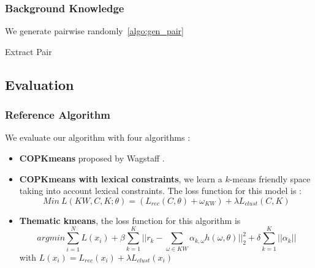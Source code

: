 \subsubsection{Background Knowledge}
We generate pairwise randomly~\ref{algo:gen_pair}
\begin{algorithm}[!h]
  \caption{\label{algo:gen_pair}Extract Pair}
\end{algorithm}
\subsection{Evaluation}
\subsubsection{Reference Algorithm}
We evaluate our algorithm with four algorithms :
\begin{itemize}
\item \textbf{COPKmeans} proposed by Wagstaff \cite{Wagstaff:2001:CKC:645530.655669}.
\item \textbf{COPKmeans with lexical constraints}, we learn a $k$-means
  friendly space taking into account lexical constraints. The loss
  function for this model is :
  \begin{equation}
  Min~L(KW, C, K; \theta) = (L_{rec}(C, \theta) + \omega_{KW} )+
  \lambda L_{clust}(C,K)
  \end{equation}
\item \textbf{Thematic kmeans}, the loss function for this algorithm is
  \begin{equation}
    argmin \sum_{i=1}^{N}L(x_i) + \beta\sum_{k=1}^{K}||r_k - \sum_{\omega \in KW}
    \alpha_{k,\omega}h(\omega, \theta)||_2^2 + \delta\sum_{k=1}^{K}||\alpha_k|| 
  \end{equation}
  with $L(x_i) = L_{rec}(x_i) + \lambda L_{clust}(x_i)$
\end{itemize}
